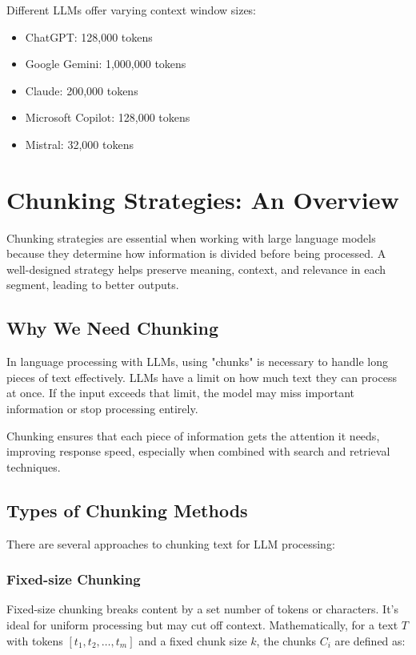 \documentclass{article}
\begin{document}
Different LLMs offer varying context window sizes:
\begin{itemize}
    \item ChatGPT: 128,000 tokens
    \item Google Gemini: 1,000,000 tokens
    \item Claude: 200,000 tokens
    \item Microsoft Copilot: 128,000 tokens
    \item Mistral: 32,000 tokens
\end{itemize}

\section{Chunking Strategies: An Overview}

Chunking strategies are essential when working with large language models because they determine how information is divided before being processed. A well-designed strategy helps preserve meaning, context, and relevance in each segment, leading to better outputs.

\subsection{Why We Need Chunking}

In language processing with LLMs, using "chunks" is necessary to handle long pieces of text effectively. LLMs have a limit on how much text they can process at once. If the input exceeds that limit, the model may miss important information or stop processing entirely.

Chunking ensures that each piece of information gets the attention it needs, improving response speed, especially when combined with search and retrieval techniques.

\subsection{Types of Chunking Methods}

There are several approaches to chunking text for LLM processing:

\subsubsection{Fixed-size Chunking}

Fixed-size chunking breaks content by a set number of tokens or characters. It's ideal for uniform processing but may cut off context. Mathematically, for a text $T$ with tokens $[t_1, t_2, \ldots, t_m]$ and a fixed chunk size $k$, the chunks $C_i$ are defined as:
\end{document}
